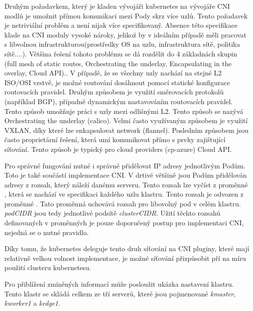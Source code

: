 Druhým požadavkem, který je kladen vývojáři kubernetes na vývojáře CNI modlů je umožnit přímou komunikaci mezi Pody skrz více uzlů. Tento požadavek je netriviální problém a není nijak více specifikovaný. Absence této specifikace klade na CNI moduly vysoké nároky, jelikož by v ideálním případě měli pracovat s libvolnou infrastrukturou(prostředky OS na uzlu, infrastruktura sítě, politika sítě....). Většina řešení tohoto problému se dá rozdělit do 4 základnách skupin (full mesh of static routes, Orchestrating the underlay, Encapsulating in the overlay, Cloud API).\cite{kashin_2022_cni}\cite{cncfcloudnativecomputingfoundation_2019_kubernetes}. V případě, že se všechny uzly nachází na stejné L2 ISO/OSI vrstvě, je možné routování dosáhnout pomocí statické konfigurace routovacích pravidel. Druhým způsobem je využití směrovacích protokolů (například BGP), případně dynamickým nastavováním routovacích pravidel. Tento způsob umožňuje práci s uzly mezi odlišnými L2. Tento způsob se nazývá Orchestrating the underlay (calico). Velmi často využívaným způsobem je využití VXLAN, díky které lze enkapsulovat network (flannel). Posledním způsobem jsou často proprietární řešení, která umí komunikovat přímo s prvky zajištující síťování. Tento způsob je typický pro cloud providers (cp-azure) Cloud API.

Pro správné fungování nutné i správně přidělovat IP adresy jednotlivým Podům. Toto je také součástí implementace CNI. V drtivé většině jsou Podům přidělován adresy z rozsah, který náleží danému serveru. Tento rozsah lze vyčíst z proměnné , která se nachází ve specifikaci každého uzlu klastru. Tento rozsah je odvozen z proměnné . Tato proměnná uchovává rozsah pro libovolný pod v celém klastru. \textit{podCIDR} jsou tedy jednotlivé podsítě \textit{clusterCIDR}. Užití těchto rozsahů definovaných v proměnných je pouze doporučený postup pro implementaci CNI, nejedná se o nutné pravidlo.\cite{cncfcloudnativecomputingfoundation_2019_kubernetes}       

Díky tomu, že kubernetes deleguje tento druh síťování na CNI pluginy, které mají relativně velkou volnost implementace, je možné síťování přizpůsobit pří na míru použití clusteru kubernetesu.

Pro přiblížení zmíněných informací může posloužit ukázka nastavení klastru. Tento klastr se skládá celkem ze tří serverů, které jsou pojmenované \textit{kmaster}, \textit{kworker1} a \textit{kedge1}.
\cite{thekubernetesauthors_2023_kubectl}





